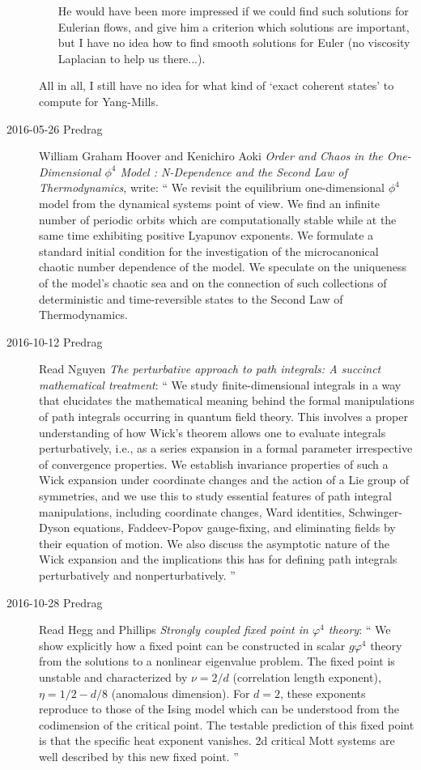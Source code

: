 \begin{description}
\begin{enumerate}
He would have been more impressed if we could find such solutions for
Eulerian flows, and give him a criterion which solutions are important,
but I have no idea how to find smooth solutions for Euler (no viscosity
Laplacian to help us there...).

\end{enumerate}

All in all, I still have no idea for what kind of `exact coherent states'
to compute for Yang-Mills.

\item[2016-05-26 Predrag]
William Graham Hoover and Kenichiro Aoki
{\em Order and Chaos in the One-Dimensional $\phi^4$ Model : N-Dependence and
  the Second Law of Thermodynamics},  write: ``
  We revisit the equilibrium one-dimensional $\phi^4$ model from the dynamical
systems point of view. We find an infinite number of periodic orbits which are
computationally stable while at the same time exhibiting positive Lyapunov
exponents. We formulate a standard initial condition for the investigation of
the microcanonical chaotic number dependence of the model. We speculate on the
uniqueness of the model's chaotic sea and on the connection of such collections
of deterministic and time-reversible states to the Second Law of
Thermodynamics.

\item[2016-10-12 Predrag]
Read Nguyen
{\em The perturbative approach to path integrals:
{A} succinct mathematical treatment}: ``
We study finite-dimensional integrals in a way that elucidates the
mathematical meaning behind the formal manipulations of path integrals
occurring in quantum field theory. This involves a proper understanding
of how Wick's theorem allows one to evaluate integrals perturbatively,
i.e., as a series expansion in a formal parameter irrespective of
convergence properties. We establish invariance properties of such a Wick
expansion under coordinate changes and the action of a Lie group of
symmetries, and we use this to study essential features of path integral
manipulations, including coordinate changes, Ward identities,
Schwinger-Dyson equations, Faddeev-Popov gauge-fixing, and eliminating
fields by their equation of motion. We also discuss the asymptotic nature
of the Wick expansion and the implications this has for defining path
integrals perturbatively and nonperturbatively.
''

\item[2016-10-28 Predrag]
Read Hegg and Phillips
{\em Strongly coupled fixed point in {$\varphi^4$} theory}: `` We show
explicitly how a fixed point can be constructed in scalar {$g\varphi^4$}
theory from the solutions to a nonlinear eigenvalue problem. The fixed
point is unstable and characterized by {$\nu=2/d$} (correlation length
exponent), {$\eta=1/2-d/8$} (anomalous dimension). For $d=2$, these
exponents reproduce to those of the Ising model which can be understood
from the codimension of the critical point. The testable prediction of
this fixed point is that the specific heat exponent vanishes. 2d critical
Mott systems are well described by this new fixed point. ''


\end{description}
